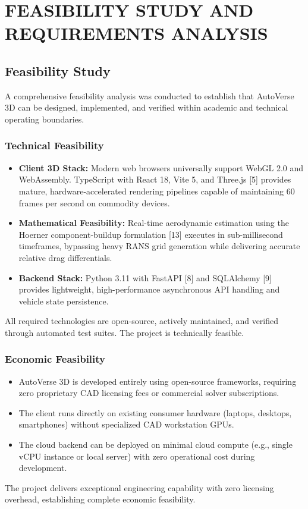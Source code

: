 \documentclass[12pt,a4paper]{report}
\begin{document}
\chapter{FEASIBILITY STUDY AND REQUIREMENTS ANALYSIS}

\section{Feasibility Study}
A comprehensive feasibility analysis was conducted to establish that AutoVerse 3D can be designed, implemented, and verified within academic and technical operating boundaries.

\subsection{Technical Feasibility}
\begin{itemize}
    \item \textbf{Client 3D Stack:} Modern web browsers universally support WebGL 2.0 and WebAssembly. TypeScript with React 18, Vite 5, and Three.js [5] provides mature, hardware-accelerated rendering pipelines capable of maintaining 60 frames per second on commodity devices.
    \item \textbf{Mathematical Feasibility:} Real-time aerodynamic estimation using the Hoerner component-buildup formulation [13] executes in sub-millisecond timeframes, bypassing heavy RANS grid generation while delivering accurate relative drag differentials.
    \item \textbf{Backend Stack:} Python 3.11 with FastAPI [8] and SQLAlchemy [9] provides lightweight, high-performance asynchronous API handling and vehicle state persistence.
\end{itemize}
All required technologies are open-source, actively maintained, and verified through automated test suites. The project is technically feasible.

\subsection{Economic Feasibility}
\begin{itemize}
    \item AutoVerse 3D is developed entirely using open-source frameworks, requiring zero proprietary CAD licensing fees or commercial solver subscriptions.
    \item The client runs directly on existing consumer hardware (laptops, desktops, smartphones) without specialized CAD workstation GPUs.
    \item The cloud backend can be deployed on minimal cloud compute (e.g., single vCPU instance or local server) with zero operational cost during development.
\end{itemize}
The project delivers exceptional engineering capability with zero licensing overhead, establishing complete economic feasibility.
\end{document}
